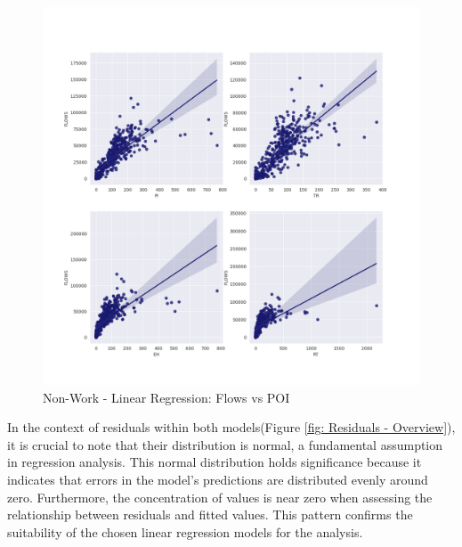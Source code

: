         \begin{figure}[H]
            \centering
            \includegraphics[width=14cm]{Images/regression_nonwork.png}
            \caption{Non-Work - Linear Regression: Flows vs POI}
            \label{fig: Regression_nonwork}
        \end{figure}


        In the context of residuals within both models(Figure \ref{fig: Residuals - Overview}), it is crucial to note that their distribution is normal, a fundamental assumption in regression analysis. This normal distribution holds significance because it indicates that errors in the model's predictions are distributed evenly around zero. Furthermore, the concentration of values is near zero when assessing the relationship between residuals and fitted values. This pattern confirms the suitability of the chosen linear regression models for the analysis.
        
